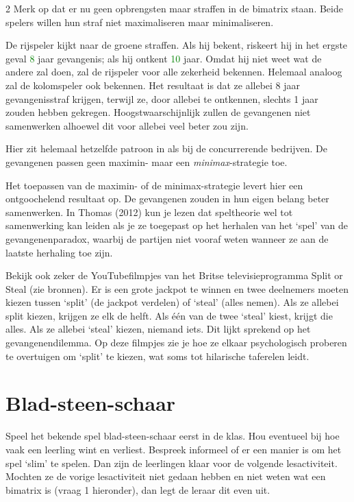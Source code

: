 \begin{multicols}{2}
Merk op dat er nu geen opbrengsten maar straffen in de bimatrix staan. Beide spelers willen hun straf niet maximaliseren maar minimaliseren.

De rijspeler kijkt naar de groene straffen. Als hij bekent, riskeert hij in het ergste geval \textcolor{green}{8} jaar gevangenis; als hij ontkent \textcolor{green}{10} jaar. Omdat hij niet weet wat de andere zal doen, zal de rijspeler voor alle zekerheid bekennen. Helemaal analoog zal de kolomspeler ook bekennen. Het resultaat is dat ze allebei 8 jaar gevangenisstraf krijgen, terwijl ze, door allebei te ontkennen, slechts 1 jaar zouden hebben gekregen. Hoogstwaarschijnlijk zullen de gevangenen niet samenwerken alhoewel dit voor allebei veel beter zou zijn.

Hier zit helemaal hetzelfde patroon in als bij de concurrerende bedrijven. De gevangenen passen geen maximin- maar een \emph{minimax}-strategie toe.

Het toepassen van de maximin- of de minimax-strategie levert hier een ontgoochelend resultaat op. De gevangenen zouden in hun eigen belang beter samenwerken. In Thomas (2012) kun je lezen dat speltheorie wel tot samenwerking kan leiden als je ze toegepast op het herhalen van het `spel' van de gevangenenparadox, waarbij de partijen niet vooraf weten wanneer ze aan de laatste herhaling toe zijn.

Bekijk ook zeker de YouTubefilmpjes van het Britse televisieprogramma Split or Steal (zie bronnen). Er is een grote jackpot te winnen en twee deelnemers moeten kiezen tussen `split' (de jackpot verdelen) of `steal' (alles nemen). Als ze allebei split kiezen, krijgen ze elk de helft. Als één van de twee `steal' kiest, krijgt die alles. Als ze allebei `steal' kiezen, niemand iets. Dit lijkt sprekend op het gevangenendilemma. Op deze filmpjes zie je hoe ze elkaar psychologisch proberen te overtuigen om `split' te kiezen, wat soms tot hilarische taferelen leidt.

\section{Blad-steen-schaar}\label{sec:bladsteenschaar}
Speel het bekende spel blad-steen-schaar eerst in de klas. Hou eventueel bij hoe vaak een leerling wint en verliest. Bespreek informeel of er een manier is om het spel `slim' te spelen. Dan zijn de leerlingen klaar voor de volgende lesactiviteit. Mochten ze de vorige lesactiviteit niet gedaan hebben en niet weten wat een bimatrix is (vraag 1 hieronder), dan legt de leraar dit even uit.

\end{multicols}\clearpage
    
